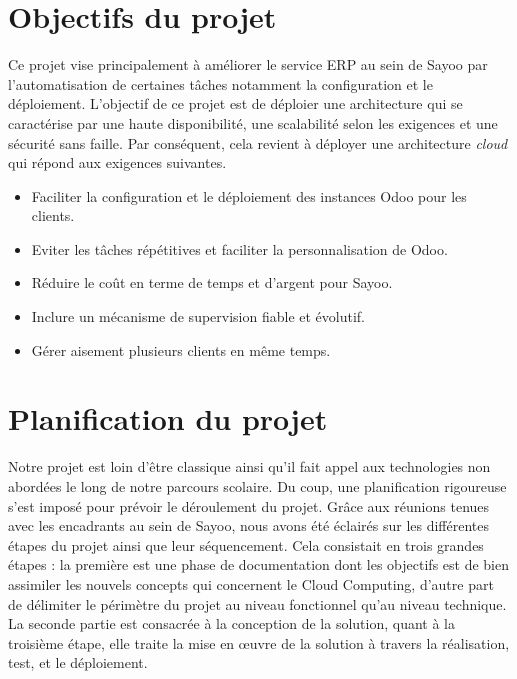 \begin{onehalfspace}
\section{Objectifs du projet}
Ce projet vise principalement à améliorer le service ERP au sein de Sayoo par l'automatisation de certaines tâches notamment la configuration et le déploiement. L'objectif de ce projet est de déploier une architecture qui se caractérise par une haute disponibilité, une scalabilité selon les exigences et une sécurité sans faille. Par conséquent, cela revient à déployer une architecture \emph{cloud} qui répond aux exigences suivantes.
\begin{itemize}

\item Faciliter la configuration et le déploiement des instances Odoo pour les clients.

\item Eviter les tâches répétitives et faciliter la personnalisation de Odoo.

\item Réduire le coût en terme de temps et d'argent pour Sayoo.

\item Inclure un mécanisme de supervision fiable et évolutif.

\item Gérer aisement plusieurs clients en même temps.  
 
 \end{itemize}






\section{Planification du projet}

Notre projet est loin d'être classique ainsi qu'il fait appel aux technologies non abordées le long de notre parcours scolaire. Du coup, une planification rigoureuse s'est imposé pour prévoir le déroulement du projet. Grâce aux réunions tenues avec les encadrants au sein de Sayoo, nous avons été éclairés sur les différentes étapes du projet ainsi que leur séquencement. Cela consistait en trois grandes étapes : la première est une phase de documentation dont les objectifs est de bien assimiler les nouvels concepts qui concernent le Cloud Computing, d'autre part de délimiter le périmètre du projet au niveau fonctionnel qu'au niveau technique. La seconde partie est consacrée à la conception de la solution, quant à la troisième étape, elle traite la mise en œuvre de la solution à travers la réalisation, test, et le déploiement.


\end{onehalfspace}
